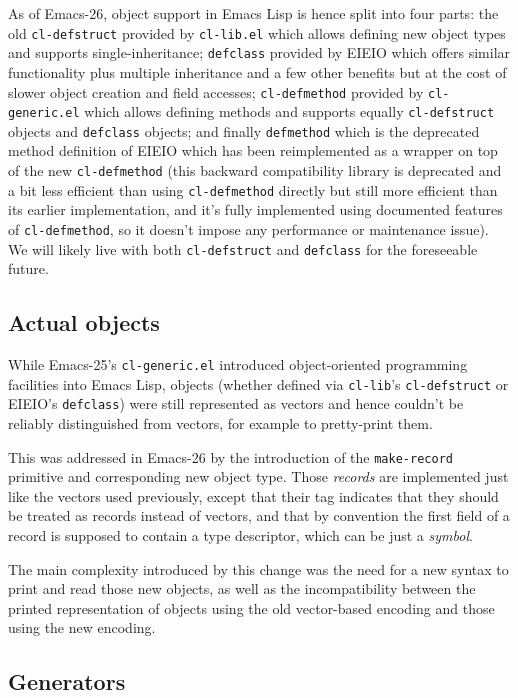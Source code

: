 \documentclass[format=acmsmall, review]{acmart}
\newcommand \Elisp {Emacs Lisp}
\begin{document}
As of Emacs-26, object support in \Elisp{} is hence split into four parts: the
old \texttt{cl-defstruct} provided by \texttt{cl-lib.el} which allows
defining new object types and supports single-inheritance; \texttt{defclass}
provided by EIEIO which offers similar functionality plus multiple
inheritance and a few other benefits but at the cost of slower object
creation and field accesses; \texttt{cl-defmethod} provided by
\texttt{cl-generic.el} which allows defining methods and supports equally
\texttt{cl-defstruct} objects and \texttt{defclass} objects; and finally
\texttt{defmethod} which is the deprecated method definition of EIEIO which
has been reimplemented as a wrapper on top of the new \texttt{cl-defmethod}
(this backward compatibility library is deprecated and a bit less efficient
than using \texttt{cl-defmethod} directly but still more efficient than its
earlier implementation, and it's fully implemented using documented features
of \texttt{cl-defmethod}, so it doesn't impose any performance or
maintenance issue).  We will likely live with both \texttt{cl-defstruct} and
\texttt{defclass} for the foreseeable future.

\subsection{Actual objects}  %
\label{sec:actual-objects}

While Emacs-25's \texttt{cl-generic.el} introduced object-oriented
programming facilities into \Elisp{}, objects (whether defined via
\texttt{cl-lib}'s \texttt{cl-defstruct} or EIEIO's \texttt{defclass}) were
still represented as vectors and hence couldn't be reliably distinguished
from vectors, for example to pretty-print them.

This was addressed in Emacs-26 by the introduction of the
\texttt{make-record} primitive and corresponding new object type.
Those \emph{records} are implemented just like the vectors used previously,
except that their tag indicates that they should be treated as records
instead of vectors, and that by convention the first field of a record is
supposed to contain a type descriptor, which can be just a \emph{symbol}.

The main complexity introduced by this change was the need for a new syntax
to print and read those new objects, as well as the incompatibility between
the printed representation of objects using the old vector-based encoding
and those using the new encoding.

\subsection{Generators}
\label{sec:generators}
\end{document}
